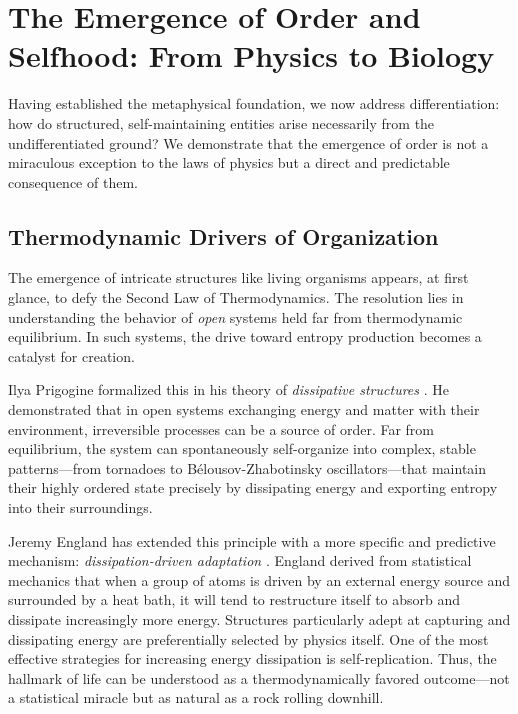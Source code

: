 \documentclass[12pt,a4paper]{article}
\begin{document}
\section{The Emergence of Order and Selfhood: From Physics to Biology}
\label{sec:emergence}

Having established the metaphysical foundation, we now address
differentiation: how do structured, self-maintaining entities arise
necessarily from the undifferentiated ground?  We demonstrate that the
emergence of order is not a miraculous exception to the laws of physics but
a direct and predictable consequence of them.

\subsection{Thermodynamic Drivers of Organization}
\label{sec:thermo}

The emergence of intricate structures like living organisms appears, at
first glance, to defy the Second Law of Thermodynamics.  The resolution
lies in understanding the behavior of \emph{open} systems held far from
thermodynamic equilibrium.  In such systems, the drive toward entropy
production becomes a catalyst for creation.

Ilya Prigogine formalized this in his theory of \emph{dissipative
structures} \citep{prigogine1977,prigogine1984}.  He demonstrated that in
open systems exchanging energy and matter with their environment,
irreversible processes can be a source of order.  Far from equilibrium, the
system can spontaneously self-organize into complex, stable patterns---from
tornadoes to B\'elousov-Zhabotinsky oscillators---that maintain their
highly ordered state precisely by dissipating energy and exporting entropy
into their surroundings.

Jeremy England has extended this principle with a more specific and
predictive mechanism: \emph{dissipation-driven adaptation}
\citep{england2013,england2015}.  England derived from statistical
mechanics that when a group of atoms is driven by an external energy source
and surrounded by a heat bath, it will tend to restructure itself to absorb
and dissipate increasingly more energy.  Structures particularly adept at
capturing and dissipating energy are preferentially selected by physics
itself.  One of the most effective strategies for increasing energy
dissipation is self-replication.  Thus, the hallmark of life can be
understood as a thermodynamically favored outcome---not a statistical
miracle but as natural as a rock rolling downhill.
\end{document}
